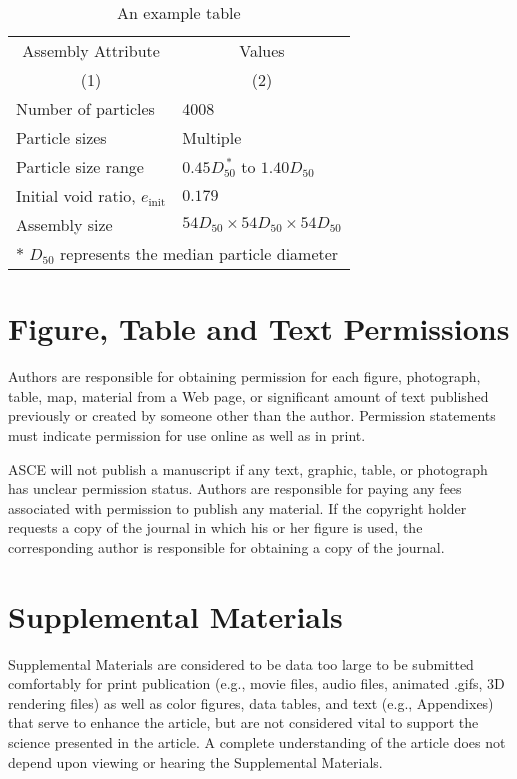\documentclass[Journal,letterpaper]{ascelike-new}
\begin{document}
	\begin{table}
		\caption{An example table}
		\label{table:assembly}
		\centering
		\small
		\renewcommand{\arraystretch}{1.25}
		\begin{tabular}{l l}
			\hline\hline
			\multicolumn{1}{c}{Assembly Attribute} &
			\multicolumn{1}{c}{Values} \\
			\multicolumn{1}{c}{(1)} &
			\multicolumn{1}{c}{(2)} \\
			\hline
			Number of particles & 4008 \\
			Particle sizes & Multiple  \\
			Particle size range & $0.45D_{50}^{\:\ast}$ to $1.40D_{50}$ \\
			Initial void ratio, $e_{\mathrm{init}}$ & $0.179$ \\
			Assembly size & $54D_{50} \times 54D_{50} \times 54D_{50}$ \\
			\hline
			\multicolumn{2}{l}{$\ast$ $D_{50}$ represents the median particle diameter} \\
			\hline\hline
		\end{tabular}
		\normalsize
	\end{table}
	
	\section{Figure, Table and Text Permissions}
	
	Authors are responsible for obtaining permission for each figure, photograph, table, map, material from a Web page, or significant amount of text published previously or created by someone other than the author. Permission statements must indicate permission for use online as well as in print.
	
	ASCE will not publish a manuscript if any text, graphic, table, or photograph has unclear permission status. Authors are responsible for paying any fees associated with permission to publish any material. If the copyright holder requests a copy of the journal in which his or her figure is used, the corresponding author is responsible for obtaining a copy of the journal.
	
	\section{Supplemental Materials}
	
	Supplemental Materials are considered to be data too large to be submitted comfortably for print publication (e.g., movie files, audio files, animated .gifs, 3D rendering files) as well as color figures, data tables, and text (e.g., Appendixes) that serve to enhance the article, but are not considered vital to support the science presented in the article. A complete understanding of the article does not depend upon viewing or hearing the Supplemental Materials.
	
\end{document}
